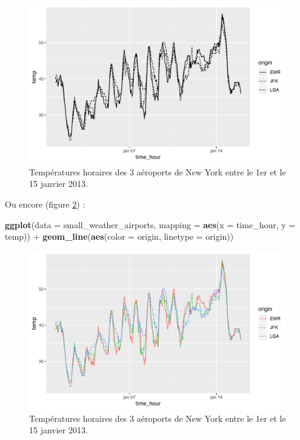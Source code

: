 \documentclass[a4paperpaper,]{article}
\newenvironment{Shaded}{\begin{snugshade}}{\end{snugshade}}
\newcommand{\DataTypeTok}[1]{\textcolor[rgb]{0.00,0.34,0.68}{#1}}
\newcommand{\KeywordTok}[1]{\textcolor[rgb]{0.12,0.11,0.11}{\textbf{#1}}}
\newcommand{\NormalTok}[1]{\textcolor[rgb]{0.12,0.11,0.11}{#1}}
\newcommand{\OperatorTok}[1]{\textcolor[rgb]{0.12,0.11,0.11}{#1}}
\newcommand{\StringTok}[1]{\textcolor[rgb]{0.75,0.01,0.01}{#1}}
\begin{document}
\begin{figure}[htpb]

{\centering \includegraphics[width=0.9\linewidth]{figure/linetype-1} 

}

\caption{Températures horaires des 3 aéroports de New York entre le 1er et le 15 janvier 2013.}\label{fig:linetype}
\end{figure}

Ou encore (figure \ref{fig:linetypecolor}) :

\begin{Shaded}
\begin{Highlighting}[]
\KeywordTok{ggplot}\NormalTok{(}\DataTypeTok{data =}\NormalTok{ small_weather_airports, }
       \DataTypeTok{mapping =} \KeywordTok{aes}\NormalTok{(}\DataTypeTok{x =}\NormalTok{ time_hour, }\DataTypeTok{y =}\NormalTok{ temp)) }\OperatorTok{+}
\StringTok{  }\KeywordTok{geom_line}\NormalTok{(}\KeywordTok{aes}\NormalTok{(}\DataTypeTok{color =}\NormalTok{ origin, }\DataTypeTok{linetype =}\NormalTok{ origin))}
\end{Highlighting}
\end{Shaded}

\begin{figure}[htpb]

{\centering \includegraphics[width=0.9\linewidth]{figure/linetypecolor-1} 

}

\caption{Températures horaires des 3 aéroports de New York entre le 1er et le 15 janvier 2013.}\label{fig:linetypecolor}
\end{figure}
\end{document}
